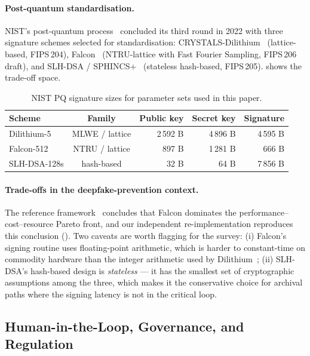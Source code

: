 \documentclass[11pt,a4paper]{article}
\theoremstyle{definition}
\theoremstyle{plain}
\theoremstyle{remark}
\begin{document}
\paragraph{Post-quantum standardisation.}
NIST's post-quantum process~\cite{bib17} concluded its third round in
2022 with three signature schemes selected for standardisation:
CRYSTALS-Dilithium~\cite{bib32} (lattice-based, FIPS\,204),
Falcon~\cite{bib31} (NTRU-lattice with Fast Fourier Sampling,
FIPS\,206 draft), and SLH-DSA / SPHINCS+~\cite{bib33} (stateless
hash-based, FIPS\,205).  shows the trade-off space.

\begin{table}[!ht]\centering
\caption{NIST PQ signature sizes for parameter sets used in this paper.}
\label{tab:pqsizes}
\small
\begin{tabular}{l c r r r}
\toprule
Scheme & Family & Public key & Secret key & Signature \\
\midrule
Dilithium-5  & MLWE / lattice  & 2\,592 B & 4\,896 B & 4\,595 B \\
Falcon-512   & NTRU / lattice  &    897 B & 1\,281 B &    666 B \\
SLH-DSA-128s & hash-based      &     32 B &     64 B & 7\,856 B \\
\bottomrule
\end{tabular}
\end{table}

\paragraph{Trade-offs in the deepfake-prevention context.}
The reference framework~\cite{bib4} concludes that Falcon dominates
the performance--cost--resource Pareto front, and our independent
re-implementation reproduces this conclusion
(). Two caveats are worth flagging
for the survey: (i) Falcon's signing routine uses floating-point
arithmetic, which is harder to constant-time on commodity hardware
than the integer arithmetic used by Dilithium~\cite{bib31};
(ii) SLH-DSA's hash-based design is \emph{stateless} --- it has the
smallest set of cryptographic assumptions among the three, which makes
it the conservative choice for archival paths where the signing
latency is not in the critical loop.

\subsection{Human-in-the-Loop, Governance, and Regulation}\label{sec:lit-gov}
\end{document}
